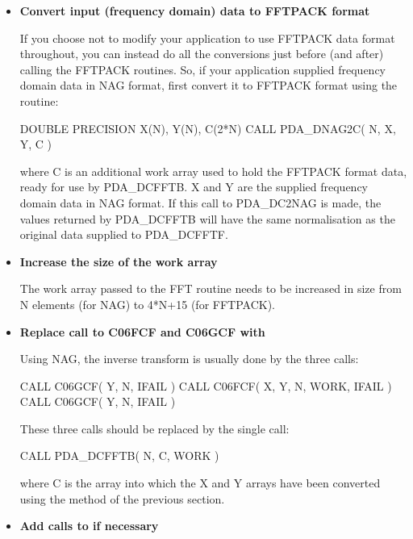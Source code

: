 \documentclass[11pt,twoside,nolof]{starlink}
\begin{document}
\begin{itemize}

\item\textbf{Convert input (frequency domain) data to FFTPACK format}

   If you choose not to modify your application to use FFTPACK data
   format throughout, you can instead do all the conversions just
   before (and after) calling the FFTPACK routines. So, if your
   application supplied frequency domain data in NAG format, first
   convert it to FFTPACK format using the
   routine:

\begin{terminalv}
      DOUBLE PRECISION X(N), Y(N), C(2*N)
      CALL PDA_DNAG2C( N, X, Y, C )
\end{terminalv}

   where C is an additional work array used to hold the FFTPACK format
   data, ready for use by PDA\_DCFFTB. X and Y are the supplied frequency
   domain data in NAG format. If this call to PDA\_DC2NAG is made, the values
   returned by PDA\_DCFFTB will have the same normalisation as the original
   data supplied to PDA\_DCFFTF.

\item\textbf{Increase the size of the work array}

   The work array passed to the FFT routine needs to be increased in
   size from N elements (for NAG) to 4*N+15 (for FFTPACK).

\item\textbf{Replace call to C06FCF and C06GCF with
}

   Using NAG, the inverse transform is usually done by the three calls:

\begin{terminalv}
      CALL C06GCF( Y, N, IFAIL )
      CALL C06FCF( X, Y, N, WORK, IFAIL )
      CALL C06GCF( Y, N, IFAIL )
\end{terminalv}

   These three calls should be replaced by the single call:

\begin{terminalv}
      CALL PDA_DCFFTB( N, C, WORK )
\end{terminalv}

   where C is the array into which the X and Y arrays have been converted
   using the method of the previous section.

\item\textbf{Add calls to
   if necessary}


\end{itemize}
\end{document}
